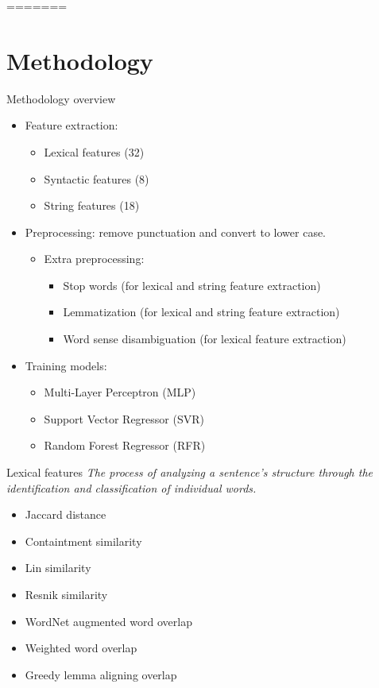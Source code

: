 =======
\section{Methodology}
\frame{\tableofcontents[currentsection]}

\begin{frame}{Methodology overview}
    \begin{itemize}
        \item Feature extraction:
        \begin{itemize}
            \item Lexical features (32)
            \item Syntactic features (8)
            \item String features (18)
        \end{itemize}
        \vspace{0.4cm}
        \item Preprocessing: remove punctuation and convert to lower case.
        \begin{itemize}
            \item Extra preprocessing:
            \begin{itemize}
                \item Stop words (for lexical and string feature extraction)
                \item Lemmatization (for lexical and string feature extraction)
                \item Word sense disambiguation (for lexical feature extraction)
            \end{itemize}
        \end{itemize}
        \vspace{0.4cm}
        \item Training models:
        \begin{itemize}
            \item Multi-Layer Perceptron (MLP)
            \item Support Vector Regressor (SVR)
            \item Random Forest Regressor (RFR)
        \end{itemize} 
    \end{itemize}
\end{frame}


\begin{frame}{Lexical features}
\textit{The process of analyzing a sentence's structure through the identification and classification of individual words.}
\vspace{0.5cm}
\begin{itemize}
    \item Jaccard distance 
    \item Containtment similarity 
    \item Lin similarity 
    \item Resnik similarity 
    \item WordNet augmented word overlap 
    \item Weighted word overlap 
    \item Greedy lemma aligning overlap
\end{itemize}
\end{frame}

